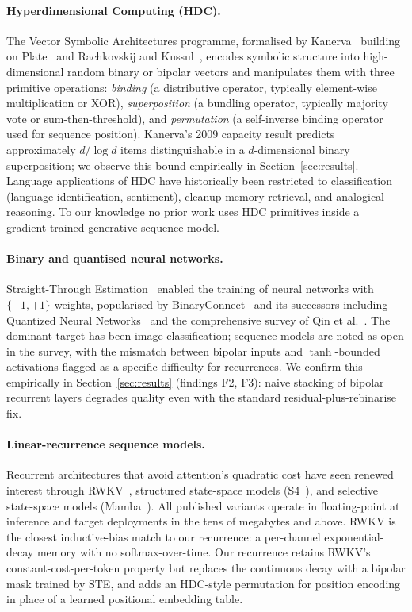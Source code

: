 \documentclass[runningheads]{llncs}
\begin{document}
\paragraph{Hyperdimensional Computing (HDC).}
The Vector Symbolic Architectures programme, formalised by
Kanerva~\cite{kanerva2009hyperdimensional} building on
Plate~\cite{plate1995holographic} and
Rachkovskij and Kussul~\cite{rachkovskij2001binding}, encodes symbolic
structure into high-dimensional random binary or bipolar vectors and
manipulates them with three primitive operations: \emph{binding} (a
distributive operator, typically element-wise multiplication or XOR),
\emph{superposition} (a bundling operator, typically majority vote or
sum-then-threshold), and \emph{permutation} (a self-inverse binding
operator used for sequence position). Kanerva's 2009 capacity result
predicts approximately $d/\log d$ items distinguishable in a
$d$-dimensional binary superposition; we observe this bound empirically
in Section~\ref{sec:results}. Language applications of HDC have
historically been restricted to classification (language
identification, sentiment), cleanup-memory retrieval, and analogical
reasoning. To our knowledge no prior work uses HDC primitives inside a
gradient-trained generative sequence model.

\paragraph{Binary and quantised neural networks.}
Straight-Through Estimation~\cite{bengio2013estimating} enabled the
training of neural networks with $\{-1,+1\}$ weights, popularised by
BinaryConnect~\cite{courbariaux2016binaryconnect} and its successors
including Quantized Neural Networks~\cite{hubara2016quantized} and the
comprehensive survey of Qin et al.~\cite{qin2020binary}. The dominant
target has been image classification; sequence models are noted as
open in the survey, with the mismatch between bipolar inputs and
$\tanh$-bounded activations flagged as a specific difficulty for
recurrences. We confirm this empirically in Section~\ref{sec:results}
(findings F2, F3): naive stacking of bipolar recurrent layers degrades
quality even with the standard residual-plus-rebinarise fix.

\paragraph{Linear-recurrence sequence models.}
Recurrent architectures that avoid attention's quadratic cost have
seen renewed interest through
RWKV~\cite{peng2023rwkv}, structured state-space models
(S4~\cite{gu2022s4}), and selective state-space models
(Mamba~\cite{gu2023mamba}). All published variants operate in
floating-point at inference and target deployments in the tens of
megabytes and above. RWKV is the closest inductive-bias match to our
recurrence: a per-channel exponential-decay memory with no
softmax-over-time. Our recurrence retains RWKV's constant-cost-per-token
property but replaces the continuous decay with a bipolar mask trained
by STE, and adds an HDC-style permutation for position encoding in
place of a learned positional embedding table.
\end{document}
